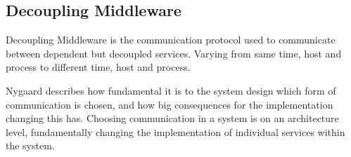 \subsection{Decoupling Middleware}
Decoupling Middleware is the communication protocol used to communicate between dependent but decoupled services. Varying from same time, host and process to different time, host and process.

Nygaard describes how fundamental it is to the system design which form of communication is chosen, and how big consequences for the implementation changing this has. Choosing communication in a system is on an architecture level, fundamentally changing the implementation of individual services within the system.

